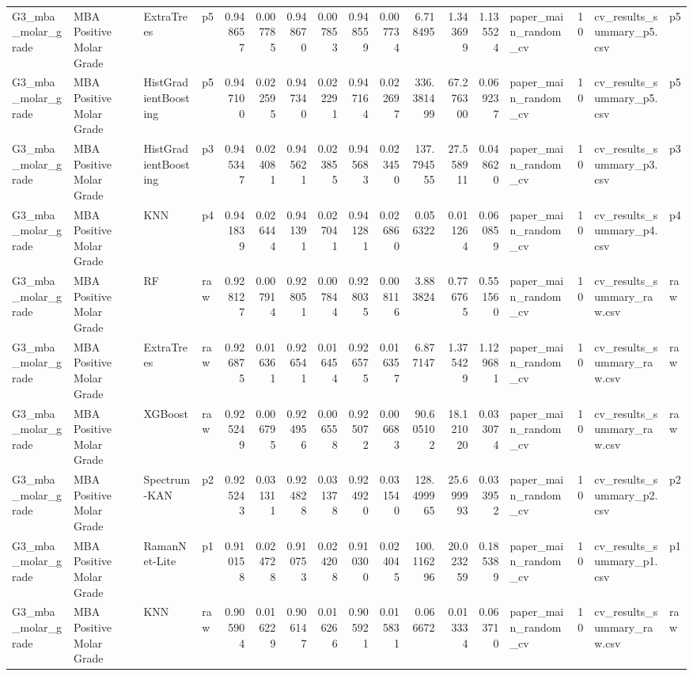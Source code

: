 \begin{tabular}{llllrrrrrrrrrlrll}
G3_mba_molar_grade & MBA Positive Molar Grade & ExtraTrees & p5 & 0.948657 & 0.007785 & 0.948670 & 0.007853 & 0.948559 & 0.007734 & 6.718495 & 1.343699 & 1.135524 & paper_main_random_cv & 10 & cv_results_summary_p5.csv & p5 \\
G3_mba_molar_grade & MBA Positive Molar Grade & HistGradientBoosting & p5 & 0.947100 & 0.022595 & 0.947340 & 0.022291 & 0.947164 & 0.022697 & 336.381499 & 67.276300 & 0.069237 & paper_main_random_cv & 10 & cv_results_summary_p5.csv & p5 \\
G3_mba_molar_grade & MBA Positive Molar Grade & HistGradientBoosting & p3 & 0.945347 & 0.024081 & 0.945621 & 0.023855 & 0.945683 & 0.023450 & 137.794555 & 27.558911 & 0.048620 & paper_main_random_cv & 10 & cv_results_summary_p3.csv & p3 \\
G3_mba_molar_grade & MBA Positive Molar Grade & KNN & p4 & 0.941839 & 0.026444 & 0.941391 & 0.027041 & 0.941281 & 0.026860 & 0.056322 & 0.011264 & 0.060859 & paper_main_random_cv & 10 & cv_results_summary_p4.csv & p4 \\
G3_mba_molar_grade & MBA Positive Molar Grade & RF & raw & 0.928127 & 0.007914 & 0.928051 & 0.007844 & 0.928035 & 0.008116 & 3.883824 & 0.776765 & 0.551560 & paper_main_random_cv & 10 & cv_results_summary_raw.csv & raw \\
G3_mba_molar_grade & MBA Positive Molar Grade & ExtraTrees & raw & 0.926875 & 0.016361 & 0.926541 & 0.016454 & 0.926575 & 0.016357 & 6.877147 & 1.375429 & 1.129681 & paper_main_random_cv & 10 & cv_results_summary_raw.csv & raw \\
G3_mba_molar_grade & MBA Positive Molar Grade & XGBoost & raw & 0.925249 & 0.006795 & 0.924956 & 0.006558 & 0.925072 & 0.006683 & 90.605102 & 18.121020 & 0.033074 & paper_main_random_cv & 10 & cv_results_summary_raw.csv & raw \\
G3_mba_molar_grade & MBA Positive Molar Grade & Spectrum-KAN & p2 & 0.925243 & 0.031311 & 0.924828 & 0.031378 & 0.924920 & 0.031540 & 128.499965 & 25.699993 & 0.033952 & paper_main_random_cv & 10 & cv_results_summary_p2.csv & p2 \\
G3_mba_molar_grade & MBA Positive Molar Grade & RamanNet-Lite & p1 & 0.910158 & 0.024728 & 0.910753 & 0.024208 & 0.910300 & 0.024045 & 100.116296 & 20.023259 & 0.185389 & paper_main_random_cv & 10 & cv_results_summary_p1.csv & p1 \\
G3_mba_molar_grade & MBA Positive Molar Grade & KNN & raw & 0.905904 & 0.016229 & 0.906147 & 0.016266 & 0.905921 & 0.015831 & 0.066672 & 0.013334 & 0.063710 & paper_main_random_cv & 10 & cv_results_summary_raw.csv & raw \\

\end{tabular}
